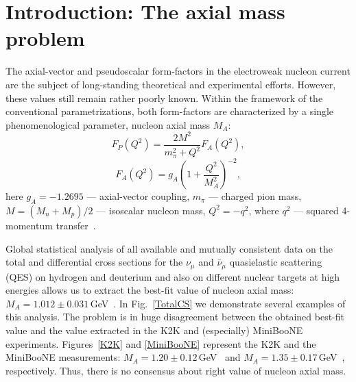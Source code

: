 \section{Introduction: The axial mass problem}
The axial-vector and pseudoscalar form-factors in the electroweak nucleon current are the subject of long-standing theoretical and experimental efforts. However, these values still remain rather poorly known. Within the framework of the conventional parametrizations, both form-factors are characterized by a single phenomenological parameter, nucleon axial mass $M_{A}$:
\begin{equation}
F_{P}(Q^{2})={}\frac{2M^{2}}{m_{\pi}^{2}+Q^{2}}F_{A}(Q^{2}),
\end{equation}
\begin{equation}
F_{A}(Q^{2})={}g_{A}\left(1+\frac{Q^{2}}{M_{A}^{2}}\right)^{-2},
\label{formfactors}
\end{equation}
here $g_{A}=-1.2695$ --- axial-vector coupling, $m_{\pi}$ --- charged pion mass, $M=(M_{n}+M_{p})/2$ --- isoscalar nucleon mass, $Q^{2}=-q^{2}$, where $q^{2}$ --- squared 4-momentum transfer~\cite{Kuzmin:2007kr}.

Global statistical analysis of all available and mutually consistent data on the total and differential cross sections for the $\nu_{\mu}$ and $\bar\nu_{\mu}$ quasielastic scattering (QES) on hydrogen and deuterium and also on different nuclear targets at high energies allows us to extract the best-fit value of nucleon axial mass: $M_{A}=1.012\pm0.031$\,GeV~\cite{Kuzmin:2014}. In Fig.~\ref{TotalCS} we demonstrate several examples of this analysis. The problem is in huge disagreement between the obtained best-fit value and the value extracted in the K2K and (especially) MiniBooNE experiments. Figures~\ref{K2K} and \ref{MiniBooNE} represent the K2K and the MiniBooNE measurements: $M_{A}=1.20\pm0.12$\,GeV~\cite{Gran:2006jn} and $M_{A}=1.35\pm0.17$\,GeV~\cite{AguilarArevalo:2010zc}, respectively. Thus, there is no consensus about right value of nucleon axial mass.

